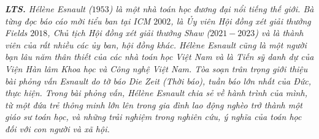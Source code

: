\vspace*{225pt}
\textit{\textbf{\color{doithoaitoanhoc}LTS.} Hélène Esnault ($1953$) là một nhà toán học đương đại nổi tiếng thế giới. Bà từng đọc báo cáo mời tiểu ban tại ICM $2002$, là Ủy viên Hội đồng xét giải thưởng Fields $2018$, Chủ tịch Hội đồng xét giải thưởng Shaw ($2021-2023$) và là thành viên của rất nhiều các ủy ban, hội đồng khác. Hélène Esnault cũng là một người bạn lâu năm thân thiết của các nhà toán học Việt Nam và là Tiến sỹ danh dự của Viện Hàn lâm Khoa học và Công nghệ Việt Nam. Tòa soạn trân trọng giới thiệu bài phỏng vấn Esnault do tờ báo Die Zeit (Thời báo), tuần báo lớn nhất của Đức, thực hiện. Trong bài phỏng vấn, Hélène Esnault chia sẻ về hành trình của mình, từ một đứa trẻ thông minh lớn lên trong gia đình lao động nghèo trở thành một giáo sư toán học, và những trải nghiệm trong nghiên cứu, ý nghĩa của toán học đối với con người và xã hội.}

